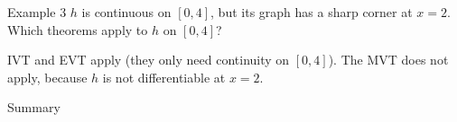 \begin{nrow}{Example 3}
$h$ is continuous on $[0,4]$, but its graph has a sharp corner at $x=2$. Which theorems apply to $h$ on $[0,4]$?
\begin{workspace}[2cm]
IVT and EVT apply (they only need continuity on $[0,4]$). The MVT does not apply, because $h$ is not differentiable at $x=2$.
\end{workspace}
\end{nrow}
\begin{nrow}{Summary}
\else\vspace{2.2cm}\fi
\end{nrow}
